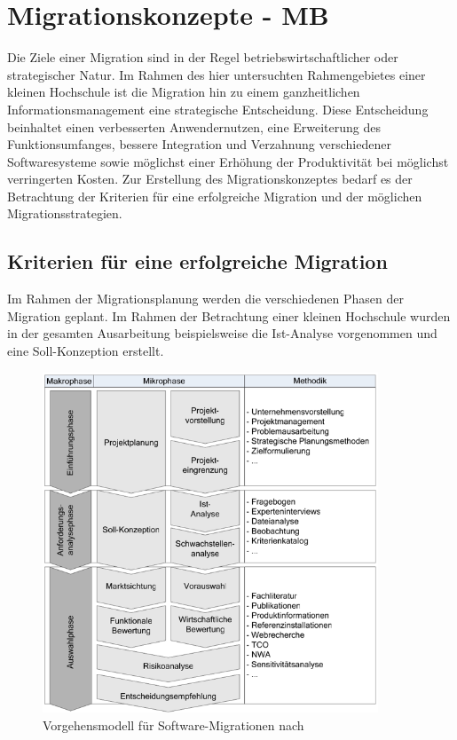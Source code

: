 \section{Migrationskonzepte - MB}
\label{section_migrationskonzepte}
Die Ziele einer Migration sind in der Regel betriebswirtschaftlicher oder strategischer Natur. Im Rahmen des hier untersuchten Rahmengebietes einer kleinen Hochschule ist die Migration hin zu einem ganzheitlichen Informationsmanagement eine strategische Entscheidung. Diese Entscheidung beinhaltet einen verbesserten Anwendernutzen, eine Erweiterung des Funktionsumfanges, bessere Integration und Verzahnung verschiedener Softwaresysteme sowie möglichst einer Erhöhung der Produktivität bei möglichst verringerten Kosten. Zur Erstellung des Migrationskonzeptes bedarf es der Betrachtung der Kriterien für eine erfolgreiche Migration und der möglichen Migrationsstrategien.

\subsection{Kriterien für eine erfolgreiche Migration}
Im Rahmen der Migrationsplanung werden die verschiedenen Phasen der Migration geplant. Im Rahmen der Betrachtung einer kleinen Hochschule wurden in der gesamten Ausarbeitung beispielsweise die Ist-Analyse vorgenommen und eine Soll-Konzeption erstellt.

\begin{figure}[h!]
	\centering
	\includegraphics[width=10cm]{kapitel/gruppe4_1/bilder/vorgehensmodell_softwaremigration}
	\caption{Vorgehensmodell für Software-Migrationen nach \cite{migrationsleitfaden_2012}}
	\label{fig_vorgehensmodell_softwaremigration}	
\end{figure}

